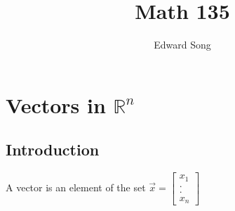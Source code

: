 \documentclass[11pt]{article}
\title{Math 135}
\author{Edward Song}
\theoremstyle{plain}
\theoremstyle{remark}
\theoremstyle{plain}
\newcommand{\rn}{\mathbb{R}}
\begin{document}
\section {Vectors in $\rn^n$}


   

\subsection{Introduction}

\begin{tcolorbox}[colback=green!5!white,colframe=green!75!black,title=Definition]
    A vector is an element of the set $\overrightarrow{x} = 
    \begin{bmatrix}
        x_1 \\ . \\ . \\ x_n
    \end{bmatrix}$
        
\end{tcolorbox}   
\end{document}
